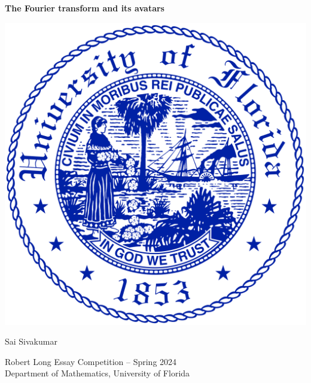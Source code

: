 \documentclass[10pt,leqno]{article}
\begin{document}
\begin{titlepage}
    \begin{center}
        \vspace*{4em}
        {\Large\textbf{The Fourier transform and its avatars}}

        \vspace{6em}
        \includegraphics[scale=0.14]{uf.png}

        \vspace{6em}
        Sai Sivakumar

        Robert Long Essay Competition -- Spring 2024\\
        Department of Mathematics, University of Florida
    \end{center}
\end{titlepage}
\pagestyle{frontmatter}
\tableofcontents\newpage


\pagestyle{body}

\end{document}
